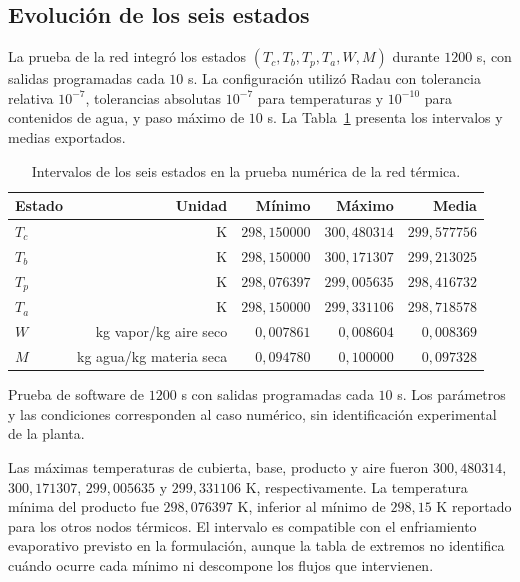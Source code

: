 \subsection{Evolución de los seis estados}

La prueba de la red integró los estados $(T_c,T_b,T_p,T_a,W,M)$ durante $1200$ s, con salidas programadas cada $10$ s. La configuración utilizó Radau con tolerancia relativa $10^{-7}$, tolerancias absolutas $10^{-7}$ para temperaturas y $10^{-10}$ para contenidos de agua, y paso máximo de $10$ s. La Tabla~\ref{tab:res_red_estados} presenta los intervalos y medias exportados.

\begin{table}[htbp]
\centering
\caption{Intervalos de los seis estados en la prueba numérica de la red térmica.}
\label{tab:res_red_estados}
\small
\setlength{\tabcolsep}{5pt}
\begin{tabular}{lrrrr}
\toprule
Estado & Unidad & Mínimo & Máximo & Media \\
\midrule
$T_c$ & K & $298{,}150000$ & $300{,}480314$ & $299{,}577756$ \\
$T_b$ & K & $298{,}150000$ & $300{,}171307$ & $299{,}213025$ \\
$T_p$ & K & $298{,}076397$ & $299{,}005635$ & $298{,}416732$ \\
$T_a$ & K & $298{,}150000$ & $299{,}331106$ & $298{,}718578$ \\
$W$ & kg vapor/kg aire seco & $0{,}007861$ & $0{,}008604$ & $0{,}008369$ \\
$M$ & kg agua/kg materia seca & $0{,}094780$ & $0{,}100000$ & $0{,}097328$ \\
\bottomrule
\end{tabular}
\par\vspace{3pt}
\begin{minipage}{0.98\textwidth}\footnotesize
Prueba de software de $1200$ s con salidas programadas cada $10$ s. Los parámetros y las condiciones corresponden al caso numérico, sin identificación experimental de la planta.
\end{minipage}
\end{table}


Las máximas temperaturas de cubierta, base, producto y aire fueron $300{,}480314$, $300{,}171307$, $299{,}005635$ y $299{,}331106$ K, respectivamente. La temperatura mínima del producto fue $298{,}076397$ K, inferior al mínimo de $298{,}15$ K reportado para los otros nodos térmicos. El intervalo es compatible con el enfriamiento evaporativo previsto en la formulación, aunque la tabla de extremos no identifica cuándo ocurre cada mínimo ni descompone los flujos que intervienen.


